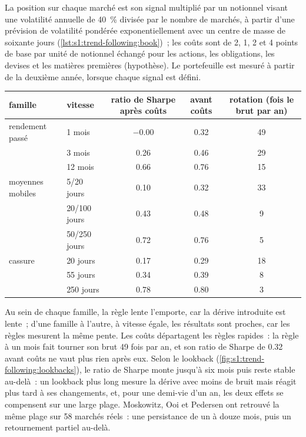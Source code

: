 La position sur chaque marché est son signal multiplié par un notionnel visant une volatilité annuelle de 40~\% divisée par le nombre de marchés, à partir d'une prévision de volatilité
pondérée exponentiellement avec un centre de masse de soixante jours (\cref{lst:s1:trend-following:book})~; les coûts sont de 2, 1, 2 et 4 points de base par unité de
notionnel échangé pour les actions, les obligations, les devises et les matières premières (hypothèse). Le portefeuille est mesuré à partir de la deuxième année, lorsque chaque signal est défini.

\begin{center}
\small
\setlength{\tabcolsep}{4pt}%
\begin{tabular}{@{}llccc@{}}
\toprule
famille & vitesse & ratio de Sharpe après coûts & avant coûts & rotation (fois le brut par an)\\
\midrule
rendement passé & 1 mois & $-0.00$ & 0.32 & 49\\
 & 3 mois & 0.26 & 0.46 & 29\\
 & 12 mois & 0.66 & 0.76 & 15\\
moyennes mobiles & 5/20 jours & 0.10 & 0.32 & 33\\
 & 20/100 jours & 0.43 & 0.48 & 9\\
 & 50/250 jours & 0.72 & 0.76 & 5\\
cassure & 20 jours & 0.17 & 0.29 & 18\\
 & 55 jours & 0.34 & 0.39 & 8\\
 & 250 jours & 0.78 & 0.80 & 3\\
\bottomrule
\end{tabular}
\end{center}

Au sein de chaque famille, la règle lente l'emporte, car la dérive introduite est lente~; d'une famille à l'autre, à vitesse égale, les résultats sont proches, car les règles
mesurent la même pente. Les coûts départagent les règles rapides~: la règle à un mois fait tourner son brut 49 fois par an, et son ratio de Sharpe de 0.32 avant coûts
ne vaut plus rien après eux. Selon le lookback (\cref{fig:s1:trend-following:lookbacks}), le ratio de Sharpe monte jusqu'à six mois puis reste stable au-delà~: un lookback plus long
mesure la dérive avec moins de bruit mais réagit plus tard à ses changements, et, pour une demi-vie d'un an, les deux effets se compensent sur une large plage. Moskowitz,
Ooi et Pedersen ont retrouvé la même plage sur 58 marchés réels~: une persistance de un à douze mois, puis un retournement partiel au-delà.

